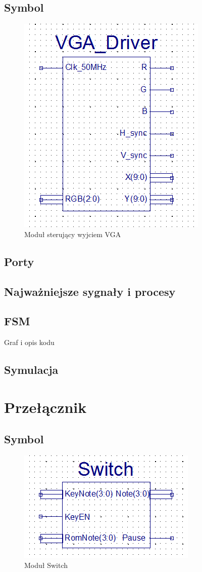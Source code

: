 \documentclass[a4paper]{report}
\begin{document}
		\subsection{Symbol}
			\begin{figure}[h!]
				\centering
				\includegraphics{vgadriver2.png}
				\caption{Moduł sterujący wyjciem VGA}
			\end{figure}
		\subsection{Porty}
		\subsection{Najważniejsze sygnały i procesy}
		\subsection{FSM}
		Graf i opis kodu
		\subsection{Symulacja}
	\section{Przełącznik}
		\subsection{Symbol}
			\begin{figure}[h!]
				\centering
				\includegraphics{switch2.png}
				\caption{Moduł Switch}
			\end{figure}
\end{document}
